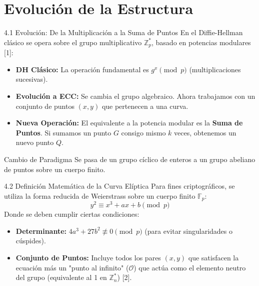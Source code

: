 \documentclass{beamer}
\begin{document}
\section{Evolución de la Estructura}
\begin{frame}{4.1 Evolución: De la Multiplicación a la Suma de Puntos}
    En el Diffie-Hellman clásico se opera sobre el grupo multiplicativo $\mathbb{Z}_p^*$, basado en potencias modulares [1]:
    \begin{itemize}
        \item \textbf{DH Clásico:} La operación fundamental es $g^x \pmod p$ (multiplicaciones sucesivas).
        \item \textbf{Evolución a ECC:} Se cambia el grupo algebraico. Ahora trabajamos con un conjunto de puntos $(x, y)$ que pertenecen a una curva.
        \item \textbf{Nueva Operación:} El equivalente a la potencia modular es la \textbf{Suma de Puntos}. Si sumamos un punto $G$ consigo mismo $k$ veces, obtenemos un nuevo punto $Q$.
    \end{itemize}
    \begin{block}{Cambio de Paradigma}
        Se pasa de un grupo cíclico de enteros a un grupo abeliano de puntos sobre un cuerpo finito.
    \end{block}
\end{frame}

\begin{frame}{4.2 Definición Matemática de la Curva Elíptica}
    Para fines criptográficos, se utiliza la forma reducida de Weierstrass sobre un cuerpo finito $\mathbb{F}_p$:
    \begin{equation}
        y^2 \equiv x^3 + ax + b \pmod p
    \end{equation}
    Donde se deben cumplir ciertas condiciones:
    \begin{itemize}
        \item \textbf{Determinante:} $4a^3 + 27b^2 \not\equiv 0 \pmod p$ (para evitar singularidades o cúspides).
        \item \textbf{Conjunto de Puntos:} Incluye todos los pares $(x, y)$ que satisfacen la ecuación más un "punto al infinito" ($\mathcal{O}$) que actúa como el elemento neutro del grupo (equivalente al 1 en $\mathbb{Z}_n^*$) [2].
    \end{itemize}
\end{frame}
\end{document}
